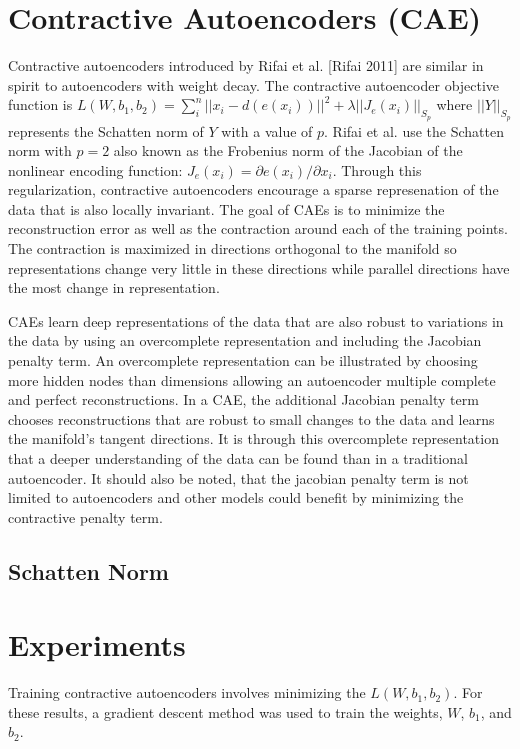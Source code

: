 \documentclass{article} %
\begin{document}
\section{Contractive Autoencoders (CAE)}

Contractive autoencoders introduced by Rifai et al. [Rifai 2011] are similar in spirit to autoencoders with weight decay. The contractive autoencoder objective function is $L(W, b_1, b_2) = \sum^n_i{ || x_i - d(e(x_i)) ||^2 } + \lambda || J_e (x_i) ||_{S_p} $ where $|| Y ||_{S_p}$ represents the Schatten norm of $Y$ with a value of $p$. Rifai et al. use the Schatten norm with $p=2$ also known as the Frobenius norm of the Jacobian of the nonlinear encoding function: $ J_{e}(x_i) = \partial e(x_i) / \partial x_i$. Through this regularization, contractive autoencoders encourage a sparse represenation of the data that is also locally invariant. The goal of CAEs is to minimize the reconstruction error as well as the contraction around each of the training points. The contraction is maximized in directions orthogonal to the manifold so representations change very little in these directions while parallel directions have the most change in representation. 

CAEs learn deep representations of the data that are also robust to variations in the data by using an overcomplete representation and including the Jacobian penalty term. An overcomplete representation can be illustrated by choosing more hidden nodes than dimensions allowing an autoencoder multiple complete and perfect reconstructions. In a CAE, the additional Jacobian penalty term chooses reconstructions that are robust to small changes to the data and learns the manifold's tangent directions. It is through this overcomplete representation that a deeper understanding of the data can be found than in a traditional autoencoder. It should also be noted, that the jacobian penalty term is not limited to autoencoders and other models could benefit by minimizing the contractive penalty term.



\subsection{Schatten Norm}

\section{Experiments}

Training contractive autoencoders involves minimizing the $L(W, b_1, b_2)$. For these results, a gradient descent method was used to train the weights, $W$, $b_1$, and $b_2$.
\end{document}
